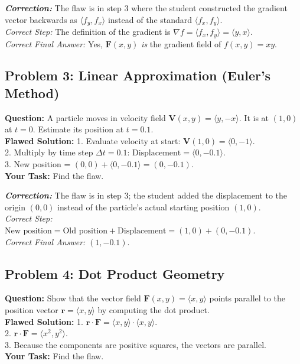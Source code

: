 \documentclass[11pt]{article}
\begin{document}
\vspace{0.2cm}
\noindent \textit{\textbf{Correction:}} The flaw is in step 3 where the student constructed the gradient vector backwards as $\langle f_y, f_x \rangle$ instead of the standard $\langle f_x, f_y \rangle$. \\
\textit{Correct Step:} The definition of the gradient is $\nabla f = \langle f_x, f_y \rangle = \langle y, x \rangle$. \\
\textit{Correct Final Answer:} Yes, $\mathbf{F}(x,y)$ \textit{is} the gradient field of $f(x,y) = xy$.

\subsection*{Problem 3: Linear Approximation (Euler's Method)}
\textbf{Question:} A particle moves in velocity field $\mathbf{V}(x,y) = \langle y, -x \rangle$. It is at $(1, 0)$ at $t=0$. Estimate its position at $t=0.1$. \\
\textbf{Flawed Solution:}
1. Evaluate velocity at start: $\mathbf{V}(1, 0) = \langle 0, -1 \rangle$. \\
2. Multiply by time step $\Delta t = 0.1$: $\text{Displacement} = \langle 0, -0.1 \rangle$. \\
3. New position = $(0, 0) + \langle 0, -0.1 \rangle = (0, -0.1)$. \\
\textbf{Your Task:} Find the flaw.

\vspace{0.2cm}
\noindent \textit{\textbf{Correction:}} The flaw is in step 3; the student added the displacement to the origin $(0,0)$ instead of the particle's actual starting position $(1,0)$. \\
\textit{Correct Step:} $\text{New position} = \text{Old position} + \text{Displacement} = (1, 0) + (0, -0.1)$. \\
\textit{Correct Final Answer:} $(1, -0.1)$.

\subsection*{Problem 4: Dot Product Geometry}
\textbf{Question:} Show that the vector field $\mathbf{F}(x,y) = \langle x, y \rangle$ points parallel to the position vector $\mathbf{r} = \langle x, y \rangle$ by computing the dot product. \\
\textbf{Flawed Solution:}
1. $\mathbf{r} \cdot \mathbf{F} = \langle x, y \rangle \cdot \langle x, y \rangle$. \\
2. $\mathbf{r} \cdot \mathbf{F} = \langle x^2, y^2 \rangle$. \\
3. Because the components are positive squares, the vectors are parallel. \\
\textbf{Your Task:} Find the flaw.
\end{document}
